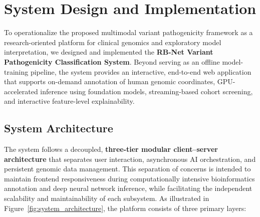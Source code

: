 
\providecommand{\tbd}{\underline{\hspace{1.2cm}}}

\chapter{System Design and Implementation}
\label{chap:system_design}

To operationalize the proposed multimodal variant pathogenicity framework as a research-oriented platform for clinical genomics and exploratory model interpretation, we designed and implemented the \textbf{RB-Net Variant Pathogenicity Classification System}. Beyond serving as an offline model-training pipeline, the system provides an interactive, end-to-end web application that supports on-demand annotation of human genomic coordinates, GPU-accelerated inference using foundation models, streaming-based cohort screening, and interactive feature-level explainability.

\section{System Architecture}
\label{sec:system_architecture}

The system follows a decoupled, \textbf{three-tier modular client--server architecture} that separates user interaction, asynchronous AI orchestration, and persistent genomic data management. This separation of concerns is intended to maintain frontend responsiveness during computationally intensive bioinformatics annotation and deep neural network inference, while facilitating the independent scalability and maintainability of each subsystem. As illustrated in Figure~\ref{fig:system_architecture}, the platform consists of three primary layers:

